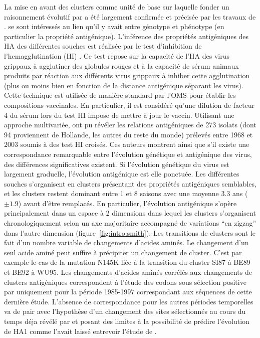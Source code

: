 La mise en avant des clusters comme unité de base sur laquelle fonder
un raisonnement évolutif par \citet{Plotkin2002} a été largement
confirmée et précisée par les travaux de \citet{Smith2004}.
\citet{Smith2004} se sont intéressés au lien qu'il y avait entre
génotype et phénotype (en particulier la propriété antigénique).
L'inférence des propriétés antigéniques des HA des différentes souches
est réalisée par le test d'inhibition de l'hemagglutination (HI)
\citep{Miller1944}. Ce test repose sur la capacité de l'HA des virus
grippaux à agglutiner des globules rouges et à la capacité de sérum
animaux produits par réaction aux différents virus grippaux à inhiber
cette agglutination (plus ou moins bien en fonction de la distance
antigénique séparant les virus). Cette technique est utilisée de
manière standard par l'OMS pour établir les compositions vaccinales.
En particulier, il est considéré qu'une dilution de facteur 4 du sérum
lors du test HI impose de mettre à jour le vaccin. Utilisant une
approche multivariée, \citet{Smith2004} ont pu révéler les relations
antigéniques de 273 isolats (dont 94 proviennent de Hollande, les
autres du reste du monde) prélevés entre 1968 et 2003 soumis à des
test HI croisés. Ces auteurs montrent ainsi que s'il existe une
correspondance remarquable entre l'évolution génétique et antigénique
des virus, des différences significatives existent. Si l'évolution
génétique du virus est largement graduelle, l'évolution antigénique
est elle ponctuée. Les différentes souches s'organisent en clusters
présentant des propriétés antigéniques semblables, et les clusters
restent dominant entre 1 et 8 saisons avec une moyenne 3.3 ans ($\pm
1.9$) avant d'être remplacés. En particulier, l'évolution antigénique
s'opère principalement dans un espace à 2 dimensions dans lequel les
clusters s'organisent chronologiquement selon un axe majoritaire
accompagné de variations ``en zigzag'' dans l'autre dimension
(figure~\ref{fig:intro:smith}).  Les transitions de clusters sont le
fait d'un nombre variable de changements d'acides aminés. Le
changement d'un seul acide aminé peut suffire à précipiter un
changement de cluster. C'est par exemple le cas de la mutation N145K
liée à la transition du cluster SI87 à BE89 et BE92 à WU95. Les
changements d'acides aminés corrélés aux changements de clusters
antigéniques correspondent à l'étude des codons sous sélection
positive par \citet{Bush1999} uniquement pour la période 1985-1997
correspondant aux séquences de cette dernière étude.  L'absence de
correspondance pour les autres périodes temporelles va de pair avec
l'hypothèse d'un changement des sites sélectionnés au cours du temps
déja révélé par \citet{Plotkin2002} et posant des limites à la
possibilité de prédire l'évolution de HA1 comme l'avait laissé
entrevoir l'étude de \citet{Bush1999}.

